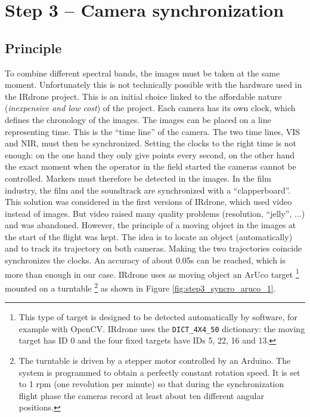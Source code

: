 \documentclass[a4paper,11pt]{report}
\newcommand{\legacyend}{}
\begin{document}
\legacyend

\chapter{Step 3 -- Camera synchronization}\label{ch:step3}
\section{Principle}
To combine different spectral bands, the images must be taken at the same moment. Unfortunately this is not technically possible with the hardware used in the IRdrone project. This is an initial choice linked to the affordable nature (\emph{inexpensive and low cost}) of the project. Each camera has its own clock, which defines the chronology of the images. The images can be placed on a line representing time. This is the ``time line'' of the camera. The two time lines, VIS and NIR, must then be synchronized. Setting the clocks to the right time is not enough: on the one hand they only give points every second, on the other hand the exact moment when the operator in the field started the cameras cannot be controlled. Markers must therefore be detected in the images. In the film industry, the film and the soundtrack are synchronized with a ``clapperboard''. This solution was considered in the first versions of IRdrone, which used video instead of images. But video raised many quality problems (resolution, ``jelly'', ...) and was abandoned. However, the principle of a moving object in the images at the start of the flight was kept. The idea is to locate an object (automatically) and to track its trajectory on both cameras. Making the two trajectories coincide synchronizes the clocks. An accuracy of about 0.05s can be reached, which is more than enough in our case.
IRdrone uses as moving object an ArUco target
\footnote{This type of target is designed to be detected automatically by software, for example with OpenCV. IRdrone uses the \texttt{DICT\_4X4\_50} dictionary: the moving target has ID 0 and the four fixed targets have IDs 5, 22, 16 and 13.}
mounted on a turntable
\footnote{The turntable is driven by a stepper motor controlled by an Arduino. The system is programmed to obtain a perfectly constant rotation speed. It is set to 1 rpm (one revolution per minute) so that during the synchronization flight phase the cameras record at least about ten different angular positions.} as shown in Figure \ref{fig:step3_syncro_aruco_1}.
\end{document}
